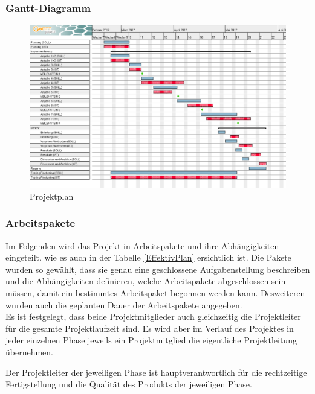 \documentclass[a4paper,10pt]{article}
\begin{document}
\subsubsection{Gantt-Diagramm}
\begin{figure}[h!]
\centering
\includegraphics[width=1\linewidth]{img/projektplanung.png}
\caption{Projektplan}
\label{prplan}
\end{figure}

\subsubsection{Arbeitspakete}
Im Folgenden wird das Projekt in Arbeitspakete und ihre Abhängigkeiten eingeteilt, wie es auch in der Tabelle \ref{EffektivPlan} ersichtlich ist. Die Pakete wurden so gewählt, dass sie genau eine geschlossene Aufgabenstellung beschreiben und die Abhängigkeiten definieren, welche Arbeitspakete abgeschlossen sein müssen, damit ein bestimmtes Arbeitspaket begonnen werden kann. Desweiteren wurden auch die geplanten Dauer der Arbeitspakete angegeben. \\

Es ist festgelegt, dass beide Projektmitglieder auch gleichzeitig die
Projektleiter für die gesamte Projektlaufzeit sind. Es wird aber im
Verlauf des Projektes in jeder einzelnen Phase jeweils ein
Projektmitglied die eigentliche Projektleitung übernehmen.

Der Projektleiter der jeweiligen Phase ist hauptverantwortlich für die
rechtzeitige Fertigstellung und die Qualität des Produkts der jeweiligen
Phase.
\end{document}
